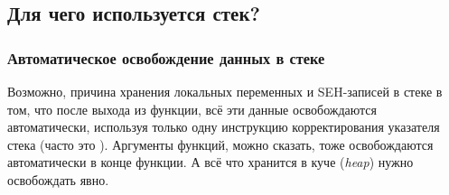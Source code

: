 \subsection{Для чего используется стек?}



\EN{}
\RU{}
\PTBR{}




\subsubsection{Автоматическое освобождение данных в стеке}

Возможно, причина хранения локальных переменных и SEH-записей в стеке в том, что после выхода из функции, всё эти данные освобождаются автоматически,
используя только одну инструкцию корректирования указателя стека (часто это \ADD).
Аргументы функций, можно сказать, тоже освобождаются автоматически в конце функции.
А всё что хранится в куче (\emph{heap}) нужно освобождать явно.

\EN{}
\RU{}
\PTBR{}



